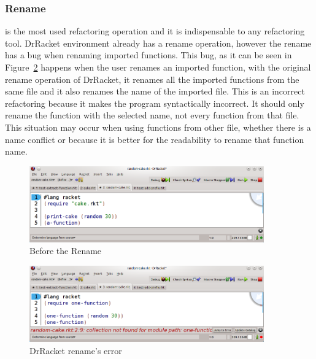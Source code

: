 \subsubsection{Rename}
\label{ssub:Rename}
is the most used refactoring operation and it is indispensable to any refactoring tool.
DrRacket environment already has a rename operation, however the rename has a bug when renaming imported functions.
This bug, as it can be seen in Figure~\ref{fig:RacketBug} happens when the user renames an imported function, with the original rename operation of DrRacket, it renames all the imported functions from the same file and it also renames the name of the imported file.
This is an incorrect refactoring because it makes the program syntactically incorrect. It should only rename the function with the selected name, not every function from that file.
This situation may occur when using functions from other file, whether there is a name conflict or because it is better for the readability to rename that function name.
\begin{figure}[htbp]
	\centering
	\includegraphics[width=0.9\textwidth]{img/renameV2-1.png}
	\caption{Before the Rename}
	\label{fig:renameBefore}
\end{figure}

\begin{figure}[htbp]
	\centering
	\includegraphics[width=0.9\textwidth]{img/rename-error.png}
	\caption{DrRacket rename's error}
	\label{fig:RacketBug}
\end{figure}

